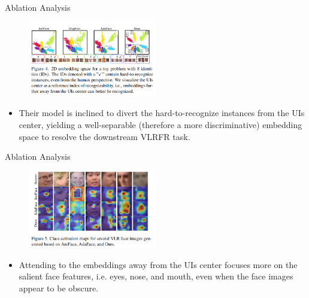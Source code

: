 \documentclass[aspectratio=169,xcolor=dvipsnames]{beamer}
\begin{document}

\begin{frame}{Ablation Analysis}
    \begin{figure}
        \centering
        \includegraphics[width=0.5\textwidth]{imgs/06_Fig_4_AA.png}
        \label{fig:f4-aa}
    \end{figure}
    \begin{itemize}
        \item Their model is inclined to divert the hard-to-recognize instances from the UIs center, yielding a well-separable (therefore a more discriminative) embedding space to resolve the downstream VLRFR task.
    \end{itemize}
\end{frame}


\begin{frame}{Ablation Analysis}
    \begin{figure}
        \centering
        \includegraphics[width=0.5\textwidth]{imgs/07_Fig_5_AA.png}
        \label{fig:f5-aa}
    \end{figure}
    \begin{itemize}
        \item Attending to the embeddings away from the UIs center focuses more on the salient face features, i.e. eyes, nose, and mouth, even when the face images appear to be obscure.
    \end{itemize}
\end{frame}
\end{document}
